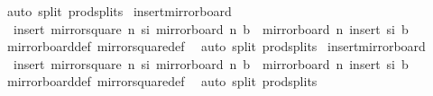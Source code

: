 \begin{isabellebody}
\ {\isacharparenleft}{\kern0pt}auto\ split{\isacharcolon}{\kern0pt}\ prod{\isachardot}{\kern0pt}splits{\isacharparenright}{\kern0pt}%
\endisatagproof
{\isafoldproof}%
%
\isadelimproof
\isanewline
%
\endisadelimproof
\isanewline
{}\isamarkupfalse%
\ insert{\isacharunderscore}{\kern0pt}mirror{}{\isacharunderscore}{\kern0pt}board{\isacharcolon}{\kern0pt}\ \isanewline
\ \ {\isachardoublequoteopen}insert\ {\isacharparenleft}{\kern0pt}mirror{}{\isacharunderscore}{\kern0pt}square\ n\ s\isactrlsub i{\isacharparenright}{\kern0pt}\ {\isacharparenleft}{\kern0pt}mirror{}{\isacharunderscore}{\kern0pt}board\ n\ b{\isacharparenright}{\kern0pt}\ {\isacharequal}{\kern0pt}\ mirror{}{\isacharunderscore}{\kern0pt}board\ n\ {\isacharparenleft}{\kern0pt}insert\ s\isactrlsub i\ b{\isacharparenright}{\kern0pt}{\isachardoublequoteclose}\isanewline
%
\isadelimproof
\ \ %
\endisadelimproof
%
\isatagproof
{}\isamarkupfalse%
\ mirror{}{\isacharunderscore}{\kern0pt}board{\isacharunderscore}{\kern0pt}def\ mirror{}{\isacharunderscore}{\kern0pt}square{\isacharunderscore}{\kern0pt}def\ \isamarkupfalse%
\ {\isacharparenleft}{\kern0pt}auto\ split{\isacharcolon}{\kern0pt}\ prod{\isachardot}{\kern0pt}splits{\isacharparenright}{\kern0pt}%
\endisatagproof
{\isafoldproof}%
%
\isadelimproof
\isanewline
%
\endisadelimproof
\isanewline
{}\isamarkupfalse%
\ insert{\isacharunderscore}{\kern0pt}mirror{}{\isacharunderscore}{\kern0pt}board{\isacharcolon}{\kern0pt}\ \isanewline
\ \ {\isachardoublequoteopen}insert\ {\isacharparenleft}{\kern0pt}mirror{}{\isacharunderscore}{\kern0pt}square\ n\ s\isactrlsub i{\isacharparenright}{\kern0pt}\ {\isacharparenleft}{\kern0pt}mirror{}{\isacharunderscore}{\kern0pt}board\ n\ b{\isacharparenright}{\kern0pt}\ {\isacharequal}{\kern0pt}\ mirror{}{\isacharunderscore}{\kern0pt}board\ n\ {\isacharparenleft}{\kern0pt}insert\ s\isactrlsub i\ b{\isacharparenright}{\kern0pt}{\isachardoublequoteclose}\isanewline
%
\isadelimproof
\ \ %
\endisadelimproof
%
\isatagproof
{}\isamarkupfalse%
\ mirror{}{\isacharunderscore}{\kern0pt}board{\isacharunderscore}{\kern0pt}def\ mirror{}{\isacharunderscore}{\kern0pt}square{\isacharunderscore}{\kern0pt}def\ \isamarkupfalse%
\ {\isacharparenleft}{\kern0pt}auto\ split{\isacharcolon}{\kern0pt}\ prod{\isachardot}{\kern0pt}splits{\isacharparenright}{\kern0pt}%
\endisatagproof
{\isafoldproof}%
%
\isadelimproof

\end{isabellebody}
